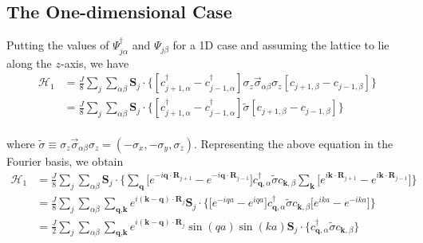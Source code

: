 \documentclass{article}
\begin{document}
\subsection{The One-dimensional Case}
Putting the values of $\Psi_{j\alpha}^\dagger$ and $\Psi_{j\beta}$ for a 1D case and assuming the lattice to lie along the $z$-axis, we have
\\
\begin{equation}
\begin{split}
\mathcal{H}_1 &=  \frac{J}{8} \sum_{j}\sum_{\alpha \beta} \textbf{S}_{j} \cdot \big\{ [c_{j+1, \alpha}^\dagger -  c_{j-1, \alpha}^\dagger] \sigma_z \vec{\sigma}_{\alpha \beta} \sigma_z [c_{j+1, \beta} -  c_{j-1, \beta}] \big\}\\
&= \frac{J}{8} \sum_{j}\sum_{\alpha \beta} \textbf{S}_{j} \cdot \big\{ [c_{j+1, \alpha}^\dagger -  c_{j-1, \alpha}^\dagger]  \tilde{\sigma}            [c_{j+1, \beta} -  c_{j-1, \beta}] \big\}
\end{split}
\end{equation}
\\
where $\tilde{\sigma}\equiv \sigma_z \vec{\sigma}_{\alpha \beta} \sigma_z= (-\sigma_x, -\sigma_y, \sigma_z)$. Representing the above equation in the Fourier basis, we obtain
\\
\begin{equation}
\begin{split}
\mathcal{H}_1 &= \frac{J}{8} \sum_{j}\sum_{\alpha \beta} \textbf{S}_{j} \cdot \Bigg\{ \sum_{\textbf{q}}\Big[ e^{-i\textbf{q} \cdot \textbf{R}_{j+1}} - e^{-i\textbf{q} \cdot \textbf{R}_{j-1}}   \Big] c_{\textbf{q},\alpha}^\dagger \tilde{\sigma}c_{\textbf{k},\beta} \sum_{\textbf{k}} \Big[ e^{i\textbf{k} \cdot \textbf{R}_{j+1}} - e^{i\textbf{k} \cdot \textbf{R}_{j-1}}   \Big] \Bigg\}\\
&= \frac{J}{8} \sum_{j}\sum_{\alpha \beta}  \sum_{\textbf{q},\textbf{k}} e^{i(\textbf{k}-\textbf{q}) \cdot\textbf{R}_j} \textbf{S}_{j} \cdot \Bigg\{\Big[ e^{-iqa} - e^{iqa}   \Big] c_{\textbf{q},\alpha}^\dagger \tilde{\sigma}c_{\textbf{k},\beta}  \Big[ e^{ika} - e^{-ika}   \Big] \Bigg\}\\
&= \frac{J}{2} \sum_{j}\sum_{\alpha \beta}\sum_{\textbf{q}, \textbf{k}}e^{i(\textbf{k}-\textbf{q}) \cdot\textbf{R}_j} \sin(qa)\sin(ka) \textbf{S}_{j} \cdot \Big\{ c_{\textbf{q},\alpha}^\dagger \tilde{\sigma}c_{\textbf{k},\beta}   \Big\}\\
\end{split}
\end{equation}
\\
\end{document}
